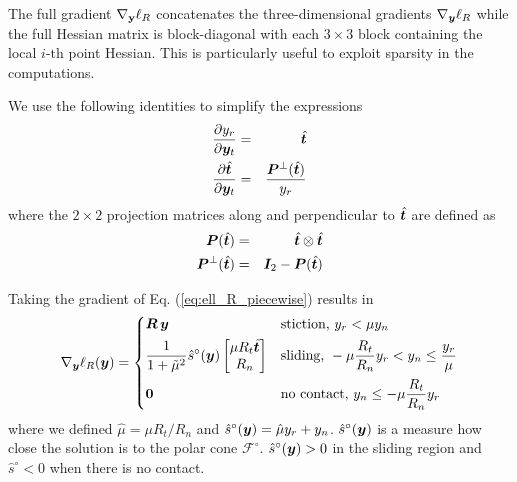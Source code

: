 The full gradient $\nabla_{\mathbf{y}}\ell_R$ concatenates the three-dimensional
gradients $\nabla_{\bm{y}}\ell_R$ while the full Hessian matrix is block-diagonal
with each $3\times 3$ block containing the local $i\text{-th}$ point Hessian.
This is particularly useful to exploit sparsity in the computations.

We use the following identities to simplify the expressions
\begin{eqnarray}
	\frac{\partial y_r}{\partial\vf{y}_t} &=& \hat{\vf{t}}\nonumber\\
	\frac{\partial \hat{\vf{t}}}{\partial\vf{y}_t} &=&
	\frac{\vf{P}^\perp(\hat{\vf{t}})}{y_r}
	\label{eq:yt_derivatives}
\end{eqnarray}
where the $2\times 2$ projection matrices along and perpendicular to
$\hat{{\bm{t}}}$ are defined as
\begin{eqnarray}
	\vf{P}(\hat{\vf{t}}) &=& \hat{\vf{t}}\otimes\hat{\vf{t}}\nonumber\\
	\vf{P}^\perp(\hat{\vf{t}})&=&\vf{I}_2 - \vf{P}(\hat{\vf{t}})
	\label{eq:tangential_projections}
\end{eqnarray}

Taking the gradient of Eq. (\ref{eq:ell_R_piecewise}) results in
\begin{equation}
	\nabla_\vf{y}\ell_R(\vf{y}) = 
\begin{dcases}
	\vf{R}\,\vf{y} & 
	\text{stiction, } y_r < \mu y_n\\
	\frac{1}{1+\tilde\mu^2}\hat{s}^\circ(\vf{y})\begin{bmatrix}
		\mu R_t\hat{\vf{t}}\\
		R_n\\
	\end{bmatrix} &
	\text{sliding, } -\mu \frac{R_t}{R_n} y_r < y_n \leq \frac{y_r}{\mu}\\
    \vf{0} & \text{no contact, } y_n \leq -\mu \frac{R_t}{R_n} y_r
\end{dcases}	  
	\label{eq:gradient_ell_R_piecewise}
\end{equation}
where we defined $\hat{\mu}=\mu R_t/R_n$ and $\hat{s}^\circ({\bm{y}}) =
\hat{\mu}y_r+y_n$. $\hat{s}^\circ({\bm{y}})$ is a measure how close the solution
is to the polar cone $\mathcal{F}^\circ$. $\hat{s}^\circ({\bm{y}}) > 0$ in the
sliding region and $\hat{s}^\circ<0$ when there is no contact.

